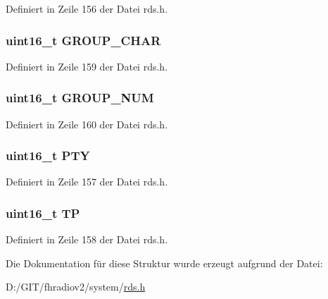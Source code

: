 Definiert in Zeile 156 der Datei rds.\+h.

\hypertarget{structblock__b_a66d4119990dc4c3e040a43885e9bb953}{}
\subsubsection[{G\+R\+O\+U\+P\+\_\+\+C\+H\+A\+R}]{\setlength{\rightskip}{0pt plus 5cm}uint16\+\_\+t G\+R\+O\+U\+P\+\_\+\+C\+H\+A\+R}\label{structblock__b_a66d4119990dc4c3e040a43885e9bb953}


Definiert in Zeile 159 der Datei rds.\+h.

\hypertarget{structblock__b_a9f692e9f76ee88348d426bcd4e9bc70b}{}
\subsubsection[{G\+R\+O\+U\+P\+\_\+\+N\+U\+M}]{\setlength{\rightskip}{0pt plus 5cm}uint16\+\_\+t G\+R\+O\+U\+P\+\_\+\+N\+U\+M}\label{structblock__b_a9f692e9f76ee88348d426bcd4e9bc70b}


Definiert in Zeile 160 der Datei rds.\+h.

\hypertarget{structblock__b_a0474967478fbbc2c71b800d2e0132d45}{}
\subsubsection[{P\+T\+Y}]{\setlength{\rightskip}{0pt plus 5cm}uint16\+\_\+t P\+T\+Y}\label{structblock__b_a0474967478fbbc2c71b800d2e0132d45}


Definiert in Zeile 157 der Datei rds.\+h.

\hypertarget{structblock__b_ab9e634c63b0d95a96716d5f6d7f06d72}{}
\subsubsection[{T\+P}]{\setlength{\rightskip}{0pt plus 5cm}uint16\+\_\+t T\+P}\label{structblock__b_ab9e634c63b0d95a96716d5f6d7f06d72}


Definiert in Zeile 158 der Datei rds.\+h.



Die Dokumentation für diese Struktur wurde erzeugt aufgrund der Datei\+:\begin{DoxyCompactItemize}
\item 
D\+:/\+G\+I\+T/fhradiov2/system/\hyperlink{rds_8h}{rds.\+h}\end{DoxyCompactItemize}
